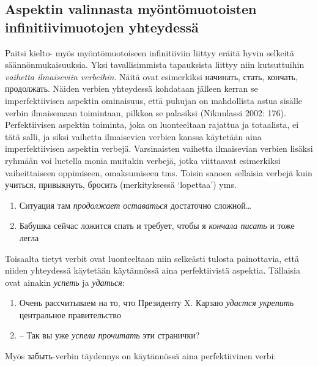 \documentclass[]{scrartcl}
\providecommand{\tightlist}{%
  \setlength{\itemsep}{0pt}\setlength{\parskip}{0pt}}
\begin{document}
\subsection{Aspektin valinnasta myöntömuotoisten infinitiivimuotojen
yhteydessä}\label{aspektin-valinnasta-myuxf6ntuxf6muotoisten-infinitiivimuotojen-yhteydessuxe4}

Paitsi kielto- myös myöntömuotoiseen infinitiiviin liittyy eräitä hyvin
selkeitä säännönmukaisuuksia. Yksi tavallisimmista tapauksista liittyy
niin kutsuttuihin \emph{vaihetta ilmaiseviin verbeihin}. Näitä ovat
esimerkiksi начинать, стать, кончать, продолжать. Näiden verbien
yhteydessä kohdataan jälleen kerran se imperfektiivisen aspektin
ominaisuus, että puhujan on mahdollista astua sisälle verbin ilmaisemaan
toimintaan, pilkkoa se palasiksi (Nikunlassi 2002: 176). Perfektiivisen
aspektin toiminta, joka on luonteeltaan rajattua ja totaalista, ei tätä
salli, ja siksi vaihetta ilmaisevien verbien kanssa käytetään aina
imperfektiivisen aspektin verbejä. Varsinaisten vaihetta ilmaisevian
verbien lisäksi ryhmään voi luetella monia muitakin verbejä, jotka
viittaavat esimerkiksi vaiheittaiseen oppimiseen, omaksumiseen tms.
Toisin sanoen sellaisia verbejä kuin учиться, привыкнуть, бросить
(merkityksessä `lopettaa') yms.

\begin{enumerate}
\def\labelenumi{(\arabic{enumi})}
\setcounter{enumi}{333}
\tightlist
\item
  Ситуация там \emph{продолжает оставаться} достаточно сложной\ldots{}
\item
  Бабушка сейчас ложится спать и требует, чтобы я \emph{кончала писать}
  и тоже легла
\end{enumerate}

Toisaalta tietyt verbit ovat luonteeltaan niin selkeästi tulosta
painottavia, että niiden yhteydessä käytetään käytännössä aina
perfektiivistä aspektia. Tällaisia ovat ainakin \emph{успеть} ja
\emph{удаться}:

\begin{enumerate}
\def\labelenumi{(\arabic{enumi})}
\setcounter{enumi}{335}
\tightlist
\item
  Очень рассчитываем на то, что Президенту X. Карзаю \emph{удастся
  укрепить} центральное правительство
\item
  -- Так вы уже \emph{успели прочитать} эти странички?
\end{enumerate}

Myös забыть-verbin täydennys on käytännössä aina perfektiivinen verbi:
\end{document}

